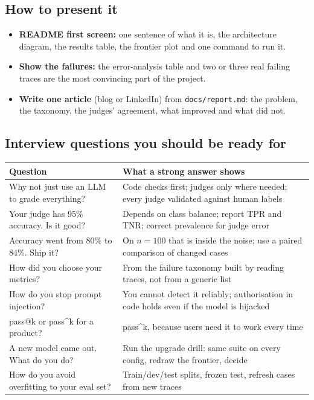 \documentclass[11pt,a4paper]{article}
\newcommand{\code}[1]{\texttt{\small #1}}
\begin{document}
\subsection{How to present it}

\begin{itemize}
\item \textbf{README first screen:} one sentence of what it is, the architecture diagram, the
results table, the frontier plot and one command to run it.
\item \textbf{Show the failures:} the error-analysis table and two or three real failing traces
are the most convincing part of the project.
\item \textbf{Write one article} (blog or LinkedIn) from \code{docs/report.md}: the problem, the
taxonomy, the judges' agreement, what improved and what did not.
\end{itemize}

\subsection{Interview questions you should be ready for}

\begin{center}
\small
\begin{tabularx}{\linewidth}{@{}X X@{}}
\toprule
\textbf{Question} & \textbf{What a strong answer shows}\\
\midrule
Why not just use an LLM to grade everything? & Code checks first; judges only where needed; every judge validated against human labels\\
Your judge has 95\% accuracy. Is it good? & Depends on class balance; report TPR and TNR; correct prevalence for judge error\\
Accuracy went from 80\% to 84\%. Ship it? & On $n = 100$ that is inside the noise; use a paired comparison of changed cases\\
How did you choose your metrics? & From the failure taxonomy built by reading traces, not from a generic list\\
How do you stop prompt injection? & You cannot detect it reliably; authorisation in code holds even if the model is hijacked\\
pass@k or pass\^{}k for a product? & pass\^{}k, because users need it to work every time\\
A new model came out. What do you do? & Run the upgrade drill: same suite on every config, redraw the frontier, decide\\
How do you avoid overfitting to your eval set? & Train/dev/test splits, frozen test, refresh cases from new traces\\
\bottomrule
\end{tabularx}
\end{center}
\end{document}
